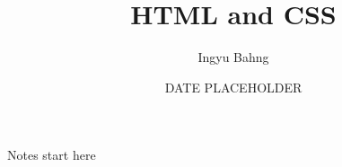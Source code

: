 \documentclass[10pt]{article}
\title{HTML and CSS}
\date{DATE PLACEHOLDER}
\author{Ingyu Bahng}
\begin{document}


Notes start here
  
\end{document}
